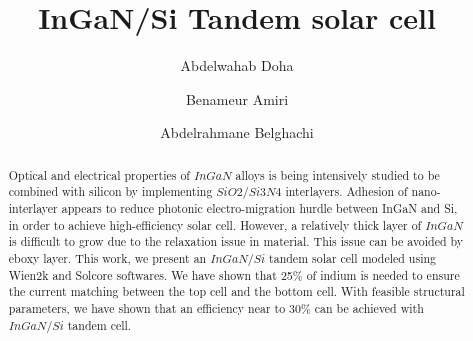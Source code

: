 \documentclass[preprint,12pt]{elsarticle}
\begin{document}
\begin{frontmatter}



\title{InGaN/Si Tandem solar cell}


\author{Abdelwahab Doha}
            
\author{Benameur Amiri}

\author{Abdelrahmane Belghachi}


\begin{abstract}
Optical and electrical properties of $InGaN$ alloys is being intensively studied to be combined with silicon by implementing $SiO2/Si3N4$ interlayers. Adhesion of nano-interlayer appears to reduce photonic electro-migration hurdle between InGaN and Si, in order to achieve high-efficiency solar cell. However, a relatively thick layer of $InGaN$ is difficult to grow due to the relaxation issue in material. This issue can be avoided by eboxy layer. This work, we present an $InGaN/Si$ tandem solar cell modeled using Wien2k and Solcore softwares. We have shown that 25\% of indium is needed to ensure the current matching between the top cell and the bottom cell. With feasible structural parameters, we have shown that an efficiency near to 30\% can be achieved with $InGaN/Si$ tandem cell.
\end{abstract}


\end{frontmatter}
\end{document}
